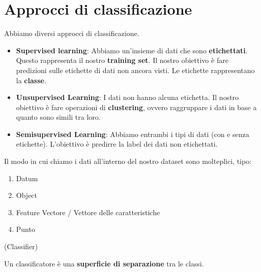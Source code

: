 

\section{Approcci di classificazione}
\label{sec:approcci-di-classificazione}

Abbiamo diversi approcci di classificazione.

\begin{itemize}
    \item \textbf{Supervised learning}: Abbiamo un'insieme di dati che sono \textbf{etichettati}.
          Questo rappresenta il nostro \textbf{training set}. Il nostro obiettivo è fare
          predizioni sulle etichette di dati non ancora visti. Le etichette rappresentano
          la \textbf{classe}.
    \item \textbf{Unsupervised Learning}: I dati non hanno alcuna etichetta. Il nostro
          obiettivo è fare operazioni di \textbf{clustering}, ovvero raggruppare i dati in base a quanto sono simili tra loro.
    \item \textbf{Semisupervised Learning}: Abbiamo entrambi i tipi di dati (con e senza etichette). L'obiettivo è predirre la label
          dei dati non etichettati.
\end{itemize}

Il modo in cui chiamo i dati all'interno del nostro dataset sono molteplici,
tipo:
\begin{enumerate}
    \item Datum
    \item Object
    \item Feature Vectore / Vettore delle caratteristiche
    \item Punto
\end{enumerate}

\begin{definition}
    (Classifier)

    Un classificatore è una \textbf{superficie di separazione} tra le classi.
\end{definition}
\newpage
